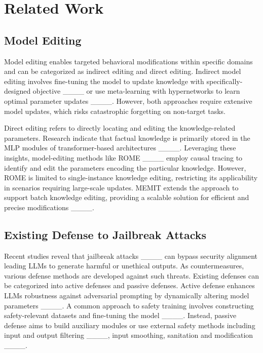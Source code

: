 \section{Related Work}
\subsection{Model Editing}
Model editing enables targeted behavioral modifications within specific domains and can be categorized as indirect editing and direct editing. Indirect model editing involves fine-tuning the model to update knowledge with specifically-designed objective ____ or use meta-learning with hypernetworks to learn optimal parameter updates ____. However, both approaches require extensive model updates, which risks catastrophic forgetting on non-target tasks.


Direct editing refers to directly locating and editing the knowledge-related parameters. Research indicate that factual knowledge is primarily stored in the MLP modules of transformer-based architectures ____.
Leveraging these insights, model-editing methods like ROME ____ employ causal tracing to identify and edit the parameters encoding the particular knowledge. However, ROME is limited to single-instance knowledge editing, restricting its applicability in scenarios requiring large-scale updates. MEMIT extends the approach to support batch knowledge editing, providing a scalable solution for efficient and precise modifications ____. 

\subsection{Existing Defense to Jailbreak Attacks}
Recent studies reveal that jailbreak attacks ____ can bypass security alignment leading LLMs to generate harmful or unethical outputs.
As countermeasures, various defense methods are developed against such threats.
Existing defenses can be categorized into active defenses and passive defenses. Active defense enhances LLMs robustness against adversarial prompting by dynamically altering model parameters ____. A common approach to safety training involves constructing safety-relevant datasets and fine-tuning the model ____.
Instead, passive defense aims to build auxiliary modules or use external safety methods including input and output filtering ____, input smoothing, sanitation and modification ____.


